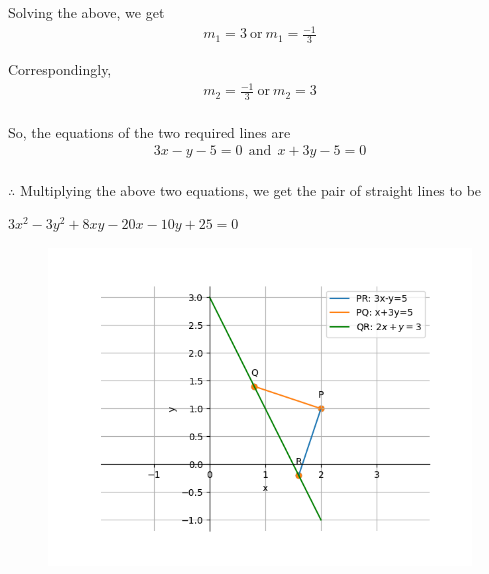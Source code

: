\documentclass[journal]{IEEEtran}
\begin{document}
Solving the above, we get
\begin{align}
    m_1 = 3 \ \text{or} \ m_1 = \frac{-1}{3}
\end{align}

Correspondingly,
\begin{align}
    m_2 = \frac{-1}{3} \ \text{or} \ m_2 = 3
\end{align}\\

So, the equations of the two required lines are
\begin{align}
    3x-y-5=0 \ \ \text{and}\ \ x+3y-5=0
\end{align}\\

$\therefore$ Multiplying the above two equations, we get the pair of straight lines to be 
\begin{center}
   $3x^2 - 3y^2 + 8xy - 20x - 10y + 25 = 0$
\end{center} 

\begin{figure}
    \centering
    \includegraphics[width=1\linewidth]{Figs/plot(py).png}
\end{figure}
\end{document}
